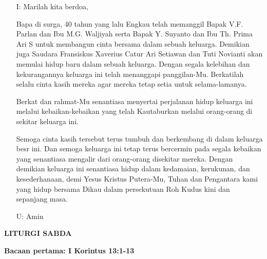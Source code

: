 \documentclass[10pt]{book}
\makeatletter
\newcommand{\judul}[1]{%
  {\parindent \z@ \centering \normalfont
    \interlinepenalty\@M \Large \bfseries #1\par\nobreak \vskip 20\p@ }}
\newcommand{\subjudul}[1]{%
  {\parindent \z@ \normalfont
    \interlinepenalty\@M \bfseries #1\par\nobreak \vskip 20\p@ }}
\newcommand{\BU}[1]{\begin{itemize} \item[U:] #1 \end{itemize}}
\newcommand{\BI}[1]{\begin{itemize} \item[I:] #1 \end{itemize}}
\newcommand{\ultah}{40 }
\newcommand{\suami}{V.F. Parlan }
\newcommand{\istri}{M.G. Waljiyah }
\newcommand{\suamidua}{Y. Suyanto }
\newcommand{\istridua}{Th. Prima Ari S }
\newcommand{\mempelaip}{Fransiskus Xaverius Catur Ari Setiawan }
\newcommand{\mempelaiw}{Tuti Novianti }
\makeatother
\begin{document}
\BI{Marilah kita berdoa,

Bapa di surga, \ultah tahun yang lalu Engkau telah memanggil Bapak \suami dan Ibu \istri serta Bapak \suamidua dan Ibu \istridua untuk membangun cinta bersama dalam sebuah keluarga. Demikian juga Saudara \mempelaip dan \mempelaiw akan memulai hidup baru dalam sebuah keluarga. Dengan segala kelebihan dan kekurangannya keluarga ini telah menanggapi panggilan-Mu. Berkatilah selalu cinta kasih mereka agar mereka tetap setia untuk selama-lamanya.

Berkat dan rahmat-Mu senantiasa menyertai perjalanan hidup keluarga ini melalui kebaikan-kebaikan yang telah Kautaburkan melalui orang-orang di sekitar keluarga ini.

Semoga cinta kasih tersebut terus tumbuh dan berkembang di dalam keluarga besr ini. Dan semoga keluarga ini tetap terus bercermin pada segala kebaikan yang senantiasa mengalir dari orang-orang disekitar mereka. Dengan demikian keluarga ini senantiasa hidup dalam kedamaian, kerukunan, dan kesederhanaan, demi Yesus Kristus Putera-Mu, Tuhan dan Pengantara kami yang hidup bersama Dikau dalam persekutuan Roh Kudus kini dan sepanjang masa.}

\BU{Amin}

\judul{LITURGI SABDA}

\subjudul{Bacaan pertama: I Korintus 13:1-13}
\end{document}
